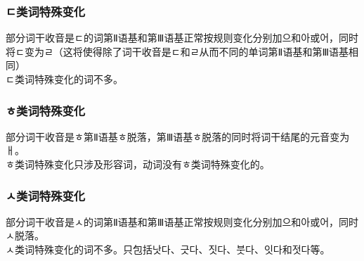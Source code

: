 \subsubsection{ㄷ类词特殊变化}
部分词干收音是ㄷ的词第Ⅱ语基和第Ⅲ语基正常按规则变化分别加으和아或어，同时将ㄷ变为ㄹ（这将使得除了词干收音是ㄷ和ㄹ从而不同的单词第Ⅱ语基和第Ⅲ语基相同）
\\\indent ㄷ类词特殊变化的词不多。
\subsubsection{ㅎ类词特殊变化}
部分词干收音是ㅎ第Ⅱ语基ㅎ脱落，第Ⅲ语基ㅎ脱落的同时将词干结尾的元音变为ㅐ。
\\\indent ㅎ类词特殊变化只涉及形容词，动词没有ㅎ类词特殊变化的。
\subsubsection{ㅅ类词特殊变化}
部分词干收音是ㅅ的词第Ⅱ语基和第Ⅲ语基正常按规则变化分别加으和아或어，同时ㅅ脱落。
\\\indent ㅅ类词特殊变化的词不多。只包括낫다、긋다、짓다、붓다、잇다和젓다等。
